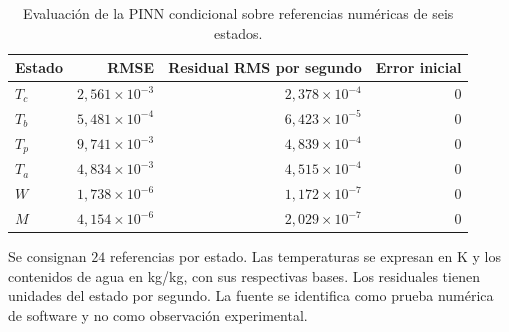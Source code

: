 \begin{table}[htbp]
\centering
\caption{Evaluación de la PINN condicional sobre referencias numéricas de seis estados.}
\label{tab:res_pinn}
\small
\setlength{\tabcolsep}{5pt}
\begin{tabular}{lrrr}
\toprule
Estado & RMSE & Residual RMS por segundo & Error inicial \\
\midrule
$T_c$ & $2{,}561\times10^{-3}$ & $2{,}378\times10^{-4}$ & $0$ \\
$T_b$ & $5{,}481\times10^{-4}$ & $6{,}423\times10^{-5}$ & $0$ \\
$T_p$ & $9{,}741\times10^{-3}$ & $4{,}839\times10^{-4}$ & $0$ \\
$T_a$ & $4{,}834\times10^{-3}$ & $4{,}515\times10^{-4}$ & $0$ \\
$W$ & $1{,}738\times10^{-6}$ & $1{,}172\times10^{-7}$ & $0$ \\
$M$ & $4{,}154\times10^{-6}$ & $2{,}029\times10^{-7}$ & $0$ \\
\bottomrule
\end{tabular}
\par\vspace{3pt}
\begin{minipage}{0.98\textwidth}\footnotesize
Se consignan $24$ referencias por estado. Las temperaturas se expresan en K y los contenidos de agua en kg/kg, con sus respectivas bases. Los residuales tienen unidades del estado por segundo. La fuente se identifica como prueba numérica de software y no como observación experimental.
\end{minipage}
\end{table}
